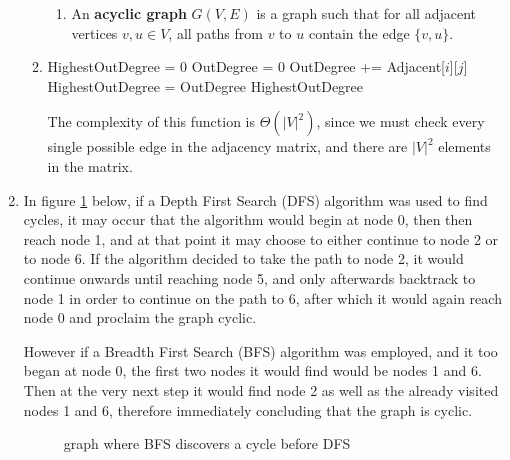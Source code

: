 \documentclass[fleqn]{article}
\begin{document}
\begin{enumerate}
\begin{enumerate}
\begin{enumerate}
			\item %
			An \textbf{acyclic graph} \(G(V, E)\) is a graph such that for all adjacent vertices \(v, u \in V\), all paths from \(v\) to \(u\) contain the edge \(\{v, u\}\).
		\end{enumerate}

		\item %
		\begin{algorithmic}[1]
				\State HighestOutDegree = 0
					\State OutDegree = 0
						\State OutDegree += Adjacent[\(i\)][\(j\)] 
					\EndFor
						\State HighestOutDegree = OutDegree
					\EndIf
				\EndFor
				\State \Return HighestOutDegree
			\EndFunction
		\end{algorithmic}

		The complexity of this function is \(\Theta(|V|^2)\), since we must check every single possible edge in the adjacency matrix, and there are \(|V|^2\) elements in the matrix.
	\end{enumerate}

	\item %
	In figure \ref{fig:cycle_BFS_before_DFS} below, if a Depth First Search (DFS) algorithm was used to find cycles, it may occur that the algorithm would begin at node 0, then then reach node 1, and at that point it may choose to either continue to node 2 or to node 6. If the algorithm decided to take the path to node 2, it would continue onwards until reaching node 5, and only afterwards backtrack to node 1 in order to continue on the path to 6, after which it would again reach node 0 and proclaim the graph cyclic.

	However if a Breadth First Search (BFS) algorithm was employed, and it too began at node 0, the first two nodes it would find would be nodes 1 and 6. Then at the very next step it would find node 2 as well as the already visited nodes 1 and 6, therefore immediately concluding that the graph is cyclic.
	\begin{figure}[h]
		\centering
		\caption{graph where BFS discovers a cycle before DFS}
		\label{fig:cycle_BFS_before_DFS}
	\end{figure}


\end{enumerate}
\end{document}
